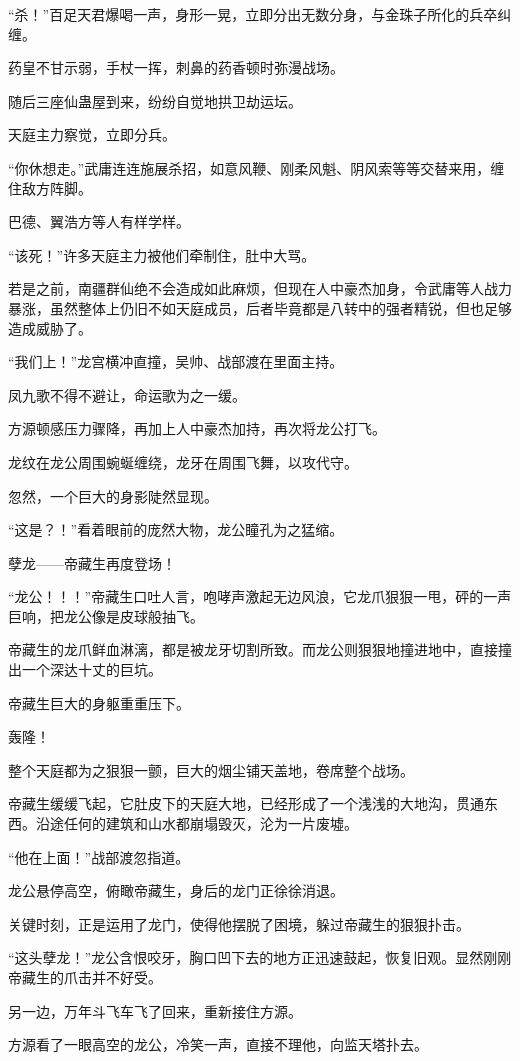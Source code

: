 \begin{this_body}
“杀！”百足天君爆喝一声，身形一晃，立即分出无数分身，与金珠子所化的兵卒纠缠。

药皇不甘示弱，手杖一挥，刺鼻的药香顿时弥漫战场。

随后三座仙蛊屋到来，纷纷自觉地拱卫劫运坛。

天庭主力察觉，立即分兵。

“你休想走。”武庸连连施展杀招，如意风鞭、刚柔风魁、阴风索等等交替来用，缠住敌方阵脚。

巴德、翼浩方等人有样学样。

“该死！”许多天庭主力被他们牵制住，肚中大骂。

若是之前，南疆群仙绝不会造成如此麻烦，但现在人中豪杰加身，令武庸等人战力暴涨，虽然整体上仍旧不如天庭成员，后者毕竟都是八转中的强者精锐，但也足够造成威胁了。

“我们上！”龙宫横冲直撞，吴帅、战部渡在里面主持。

凤九歌不得不避让，命运歌为之一缓。

方源顿感压力骤降，再加上人中豪杰加持，再次将龙公打飞。

龙纹在龙公周围蜿蜒缠绕，龙牙在周围飞舞，以攻代守。

忽然，一个巨大的身影陡然显现。

“这是？！”看着眼前的庞然大物，龙公瞳孔为之猛缩。

孽龙——帝藏生再度登场！

“龙公！！！”帝藏生口吐人言，咆哮声激起无边风浪，它龙爪狠狠一甩，砰的一声巨响，把龙公像是皮球般抽飞。

帝藏生的龙爪鲜血淋漓，都是被龙牙切割所致。而龙公则狠狠地撞进地中，直接撞出一个深达十丈的巨坑。

帝藏生巨大的身躯重重压下。

轰隆！

整个天庭都为之狠狠一颤，巨大的烟尘铺天盖地，卷席整个战场。

帝藏生缓缓飞起，它肚皮下的天庭大地，已经形成了一个浅浅的大地沟，贯通东西。沿途任何的建筑和山水都崩塌毁灭，沦为一片废墟。

“他在上面！”战部渡忽指道。

龙公悬停高空，俯瞰帝藏生，身后的龙门正徐徐消退。

关键时刻，正是运用了龙门，使得他摆脱了困境，躲过帝藏生的狠狠扑击。

“这头孽龙！”龙公含恨咬牙，胸口凹下去的地方正迅速鼓起，恢复旧观。显然刚刚帝藏生的爪击并不好受。

另一边，万年斗飞车飞了回来，重新接住方源。

方源看了一眼高空的龙公，冷笑一声，直接不理他，向监天塔扑去。


\end{this_body}
